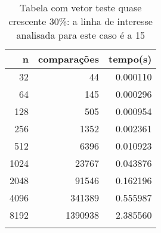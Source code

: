 \begin{table}[ht]
\centering
\begin{tabular}{rrr} \toprule
        n &    comparações &       tempo(s) \\ \midrule
      32  &             44 &      0.000110 \\
      64  &            145 &      0.000296 \\
     128  &            505 &      0.000954 \\
     256  &           1352 &      0.002361 \\
     512  &           6396 &      0.010923 \\
    1024  &          23767 &      0.043876 \\
    2048  &          91546 &      0.162196 \\
    4096  &         341389 &      0.555987 \\
    8192  &        1390938 &      2.385560 \\
\bottomrule\addlinespace
\end{tabular}
\caption{Tabela com vetor teste quase crescente 30\%: a linha de interesse analisada para este caso é a 15}
\label{tab:insertionsortQuaseCresc30}
\end{table}

